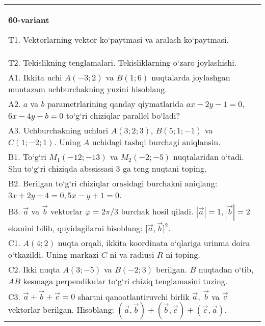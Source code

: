 \documentclass{article}
\begin{document}
\begin{tabular}{m{17cm}}
\textbf{60-variant}
\newline

T1. 
Vektorlarning vektor ko‘paytmasi va aralash ko‘paytmasi.
 \\
T2. 
Tekislikning tenglamalari. Tekisliklarning o‘zaro joylashishi.
 \\
A1. 
Ikkita uchi $A (-3; 2) $ va $B (1; 6) $ nuqtalarda
joylashgan muntazam uchburchakning yuzini hisoblang.
 \\
A2. 
$a$ va $b$ parametrlarining qanday qiymatlarida
$ax-2y-1=0$, $6x-4y-b=0$ to‘g‘ri chiziqlar parallel bo‘ladi?
 \\
A3. 
Uchburchakning uchlari
$A (3;2; 3) $, $B (5;1; - 1) $ va $C (1; -2;1) $. Uning $A$ uchidagi tashqi burchagi aniqlansin.
 \\
B1. 
To‘g‘ri \(M_{1} (-12;-13) \) va \(M_{2} (-2;-5) \)
nuqtalaridan o‘tadi. Shu to‘g‘ri chiziqda abssissasi 3 ga teng nuqtani toping.
 \\
B2. 
Berilgan to‘g‘ri chiziqlar orasidagi burchakni aniqlang: $3x+2y+4=0, 5x-y+1=0$.
 \\
B3. 
$\vec{a}$ va $\vec{b}$ vektorlar $\varphi = 2\pi/3$ burchak hosil qiladi. $|\vec{a}| = 1,|\vec{b}| = 2$ ekanini bilib, quyidagilarni hisoblang:
$\lbrack\vec{a},\vec{b}\rbrack^{2}$.
 \\
C1. \(A (4;2) \) nuqta orqali, ikkita koordinata o‘qlariga
urinma doira o‘tkazildi. Uning markazi $C$ ni va radiusi
$R$ ni toping.
 \\
C2. 
Ikki nuqta \(A (3; - 5) \) va \(B (- 2;3) \) berilgan.
$B$ nuqtadan o‘tib, $AB$ kesmaga perpendikular to‘g‘ri chiziq
tenglamasini tuzing.
 \\
C3. \(\vec{a} + \vec{b} + \vec{c} = 0\) shartni qanoatlantiruvchi birlik \(\vec{a},\ \vec{b}\) va \(\vec{c}\) vektorlar berilgan. Hisoblang: \(\left(\vec{a},\vec{b} \right) + \left(\vec{b},\vec{c} \right) + \left(\vec{c},\vec{a} \right) \).
 \\

\end{tabular}
\vspace{1cm}
\end{document}
